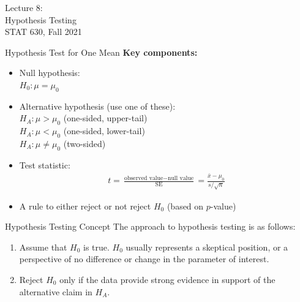\documentclass[fleqn, 10pt]{beamer}\usepackage[]{graphicx}\usepackage[]{color}
\begin{document}
\begin{frame}
\large
Lecture 8:\\
Hypothesis Testing\\
STAT 630, Fall 2021
\normalsize
\end{frame}

\begin{frame}{Hypothesis Test for One Mean}
\textbf{Key components:}
\vspace{5pt}
\begin{itemize}
\item Null hypothesis:\\
$H_0: \mu = \mu_0$
\vspace{5pt}
\item Alternative hypothesis (use one of these):\\
$H_A: \mu > \mu_0$ (one-sided, upper-tail)\\
$H_A: \mu < \mu_0$ (one-sided, lower-tail)\\
$H_A: \mu \neq \mu_0$ (two-sided)
\vspace{5pt}
\item Test statistic:
\begin{align*}
t = \frac{\text{observed value} - \text{null value}}{\text{SE}} = \frac{\bar{x} - \mu_0}{s / \sqrt{n}}
\end{align*}
\item A rule to either reject or not reject $H_0$ (based on $p$-value)
\end{itemize}
\end{frame}

\begin{frame}{Hypothesis Testing Concept}
The approach to hypothesis testing is as follows:
\vspace{5pt}
\begin{enumerate}
\item Assume that $H_0$ is true.  $H_0$ usually represents a skeptical position, or a perspective of no difference or change in the parameter of interest.
\item Reject $H_0$ only if the data provide strong evidence in support of the alternative claim in $H_A$.\\
\end{enumerate}
\end{frame}
\end{document}
